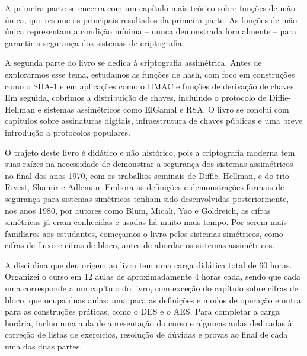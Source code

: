 A primeira parte se encerra com um capítulo mais teórico sobre funções de mão única, que resume os principais resultados da primeira parte.
As funções de mão única representam a condição mínima -- nunca demonstrada formalmente -- para garantir a segurança dos sistemas de criptografia.

A segunda parte do livro se dedica à criptografia assimétrica.
Antes de explorarmos esse tema, estudamos as funções de hash, com foco em construções como o SHA-1 e em aplicações como o HMAC e funções de derivação de chaves.
Em seguida, cobrimos a distribuição de chaves, incluindo o protocolo de Diffie-Hellman e sistemas assimétricos como ElGamal e RSA.
O livro se conclui com capítulos sobre assinaturas digitais, infraestrutura de chaves públicas e uma breve introdução a protocolos populares.

O trajeto deste livro é didático e não histórico, pois a criptografia moderna tem suas raízes na necessidade de demonstrar a segurança dos sistemas assimétricos no final dos anos 1970, com os trabalhos seminais de Diffie, Hellman, e do trio Rivest, Shamir e Adleman.
Embora as definições e demonstrações formais de segurança para sistemas simétricos tenham sido desenvolvidas posteriormente, nos anos 1980, por autores como Blum, Micali, Yao e Goldreich, as cifras simétricas já eram conhecidas e usadas há muito mais tempo.
Por serem mais familiares aos estudantes, começamos o livro pelos sistemas simétricos, como cifras de fluxo e cifras de bloco, antes de abordar os sistemas assimétricos.

A disciplina que deu origem ao livro tem uma carga didática total de 60 horas.
Organizei o curso em 12 aulas de aproximadamente 4 horas cada, sendo que cada uma corresponde a um capítulo do livro, com exceção do capítulo sobre cifras de bloco, que ocupa duas aulas:
uma para as definições e modos de operação e outra para as construções práticas, como o DES e o AES.
Para completar a carga horária, incluo uma aula de apresentação do curso e algumas aulas dedicadas à correção de listas de exercícios, resolução de dúvidas e provas ao final de cada uma das duas partes.



